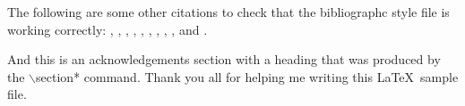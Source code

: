 \documentclass[ba]{imsart}
\numberwithin{equation}{section}
\theoremstyle{plain}
\begin{document}
The following are some other citations to check that the bibliographc style
file is working correctly: \citet{akaike}, \citet*{akivarsq}, \citet{dyke},
\citet{greene}, \citet*{kstuart}, \citet{hilbetech}, \citet{hilbe},
\citet{hilbeglm}, \citet{maddalacntrsq}, and \citet*{companion}.  





\begin{acknowledgement}
And this is an acknowledgements section with a heading that was produced by the
$\backslash$section* command. Thank you all for helping me writing this
\LaTeX\ sample file.
\end{acknowledgement}
\end{document}
